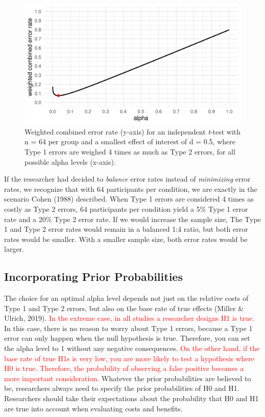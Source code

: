 \documentclass[
  english,
  ,man, a4paper,floatsintext]{apa6}
\begin{document}
\begin{figure}
\centering
\includegraphics{Justify_in_Practice_files/figure-latex/cost-plot-1.pdf}
\caption{\label{fig:cost-plot}Weighted combined error rate (y-axis) for an independent \emph{t}-test with n = 64 per group and a smallest effect of interest of d = 0.5, where Type 1 errors are weighed 4 times as much as Type 2 errors, for all possible alpha levels (x-axis).}
\end{figure}

If the researcher had decided to \emph{balance} error rates instead of \emph{minimizing} error rates, we recognize that with 64 participants per condition, we are exactly in the scenario Cohen (1988) described. When Type 1 errors are considered 4 times as costly as Type 2 errors, 64 participants per condition yield a 5\% Type 1 error rate and a 20\% Type 2 error rate. If we would increase the sample size, The Type 1 and Type 2 error rates would remain in a balanced 1:4 ratio, but both error rates would be smaller. With a smaller sample size, both error rates would be larger.

\hypertarget{incorporating-prior-probabilities}{%
\subsection{Incorporating Prior Probabilities}\label{incorporating-prior-probabilities}}

The choice for an optimal alpha level depends not just on the relative costs of Type 1 and Type 2 errors, but also on the base rate of true effects (Miller \& Ulrich, 2019). \textcolor{red}{In the extreme case, in all studies a researcher designs H1 is true.} In this case, there is no reason to worry about Type 1 errors, because a Type 1 error can only happen when the null hypothesis is true. Therefore, you can set the alpha level to 1 without any negative consequences.
\textcolor{red}{On the other hand, if the base rate of true H1s is very low, you are more likely to test a hypothesis where H0 is true. Therefore, the probability of observing a false positive becomes a more important consideration.}
Whatever the prior probabilities are believed to be, researchers always need to specify the prior probabilities of H0 and H1. Researchers should take their expectations about the probability that H0 and H1 are true into account when evaluating costs and benefits.
\end{document}
